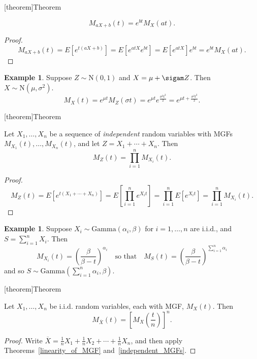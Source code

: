 \documentclass[12pt]{report}
\theoremstyle{definition}
\begin{document}
[theorem]{Theorem}
\begin{linearity of MGF}\label{linearity_of_MGF}
    \[
        M_{aX+b}(t)=e^{bt}M_X(at).
    \]
\end{linearity of MGF}
\begin{proof}
    \[
        M_{aX+b}(t)=E\left[e^{t(aX+b)}\right]=E\left[e^{atX}e^{bt}\right]
        =E\left[e^{atX}\right]e^{bt}=e^{bt}M_X(at).
    \]
\end{proof} 
\newtheorem{MGF for normal distribution}[theorem]{Example}
\begin{MGF for normal distribution}
    Suppose $Z\sim\text{N}(0,1)$ and $X=\mu+\sigam Z$. Then
    $X\sim\text{N}(\mu,\sigma^{2})$.
    \[
        M_X(t)=e^{\mu t}M_Z(\sigma t)=e^{\mu t}e^{\frac{\sigma^2t^2}{2}}
        =e^{\mu t+\frac{\sigma^2t^2}{2}}.
    \]
\end{MGF for normal distribution}

[theorem]{Theorem}
\begin{independent MGFs}\label{independent_MGFs}
    Let $X_1,\ldots,X_n$ be a sequence of \emph{independent} random variables
    with MGFs $M_{X_1}(t),\ldots,M_{X_n}(t)$, and let $Z=X_1+\cdots+X_n$. Then
    \[
        M_Z(t)=\prod_{i=1}^{n} M_{X_i}(t).
    \]
\end{independent MGFs}
\begin{proof}
    \[
        M_Z(t)=E\left[e^{t(X_1+\cdots+X_n)}\right]=E\left[\prod_{i=1}^{n}e^{X_i t}\right]
        =\prod_{i=1}^{n} E\left[e^{X_i t}\right]=\prod_{i=1}^{n} M_{X_i}(t).
    \]
\end{proof} 
\newtheorem{gamma MGF}[theorem]{Example}
\begin{gamma MGF}\label{gamma_MGF}
    Suppose $X_i\sim\text{Gamma}(\alpha_i,\beta)$ for $i=1,\ldots,n$ are
    i.i.d., and $S=\sum_{i=1}^{n} X_i$. Then
    \[
        M_{X_i}(t)=\left(\frac{\beta}{\beta-t}\right)^{\alpha_i}
        \quad\text{so that}\quad
        M_S(t)={\left(\frac{\beta}{\beta-t}\right)}^{\sum_{i=1}^{n} \alpha_i}
    \]
    and so $S\sim\text{Gamma}\left(\sum_{i=1}^{n} \alpha_i, \beta\right)$.
\end{gamma MGF}

[theorem]{Theorem}
\begin{MGF for sample mean}
    Let $X_1,\ldots,X_n$ be i.i.d. random variables, each with MGF, $M_X(t)$.
    Then
    \[
        M_{\overline{X}}(t)={\left[M_X(\frac{t}{n})\right]}^{n}.
    \]
\end{MGF for sample mean}
\begin{proof}
    Write $\overline{X}=\frac{1}{n}X_1+\frac{1}{n}X_2+\cdots+\frac{1}{n}X_n$,
    and then apply Theorems~\ref{linearity_of_MGF} and~\ref{independent_MGFs}.
\end{proof} 
\end{document}
